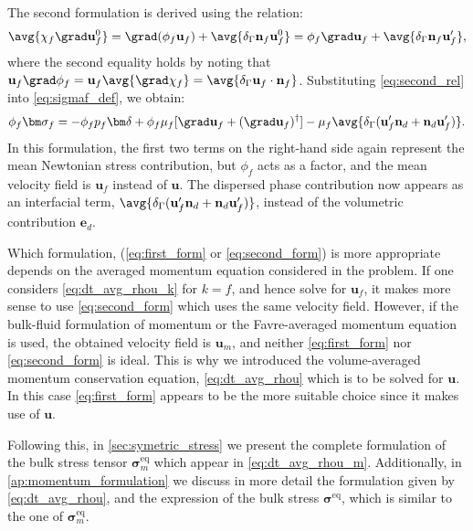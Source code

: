 The second formulation is derived using the relation: 
\begin{equation}
    \avg{\chi_f \grad \textbf{u}_f^0}
    = 
    \grad (\phi_f \textbf{u}_f)
    + \avg{\delta_\Gamma \textbf{n}_f \textbf{u}_f^0}
    = 
    \phi_f \grad  \textbf{u}_f
    + \avg{\delta_\Gamma \textbf{n}_f \textbf{u}_f'},
    \label{eq:second_rel}
\end{equation}
where the second equality holds by noting that $\textbf{u}_f \grad \phi_f =\textbf{u}_f \avg{\grad \chi_f} =\avg{\delta_\Gamma \textbf{u}_f \cdot \textbf{n}_f}$. 
Substituting \eqref{eq:second_rel} into \eqref{eq:sigmaf_def}, we obtain: 
\begin{equation}
    \phi_f\bm\sigma_f
    = 
    - \phi_f p_f \bm\delta 
    + \phi_f \mu_f [\grad \textbf{u}_f + (\grad \textbf{u}_f)^\dagger] 
    -\mu_f \avg{\delta_\Gamma (\textbf{u}_f'\textbf{n}_d + \textbf{n}_d \textbf{u}_f')}. 
    \label{eq:second_form}
\end{equation}
In this formulation, the first two terms on the right-hand side again represent the mean Newtonian stress contribution, but $\phi_f$ acts as a factor, and the mean velocity field is $\textbf{u}_f$ instead of $\textbf{u}$. 
The dispersed phase contribution now appears as an interfacial term, $\avg{\delta_\Gamma (\textbf{u}_f'\textbf{n}_d + \textbf{n}_d \textbf{u}_f')}$, instead of the volumetric contribution $\textbf{e}_d$. 

Which formulation, (\ref{eq:first_form} or \ref{eq:second_form}) is more appropriate depends on the averaged momentum equation considered in the problem.  
If one considers \ref{eq:dt_avg_rhou_k} for $k=f$, and hence solve for $\textbf{u}_f$, it makes more sense to use \ref{eq:second_form} which uses the same velocity field.
However, if the bulk-fluid formulation of momentum or the Favre-averaged momentum equation is used, the obtained velocity field is $\textbf{u}_m$, and neither \ref{eq:first_form} nor \ref{eq:second_form} is ideal. 
This is why we introduced the volume-averaged momentum conservation equation, \eqref{eq:dt_avg_rhou} which is to be solved for $\textbf{u}$. 
In this case \ref{eq:first_form} appears to be the more suitable choice since it makes use of $\textbf{u}$. 


Following this, in \ref{sec:symetric_stress} we present the complete formulation of the bulk stress tensor $\bm\sigma_m^\text{eq}$ which appear in \ref{eq:dt_avg_rhou_m}. 
Additionally, in \ref{ap:momentum_formulation} we discuss in more detail the formulation given by \ref{eq:dt_avg_rhou}, and the expression of the bulk stress $\bm\sigma^\text{eq}$, which is similar to the one of $\bm\sigma_m^\text{eq}$. 